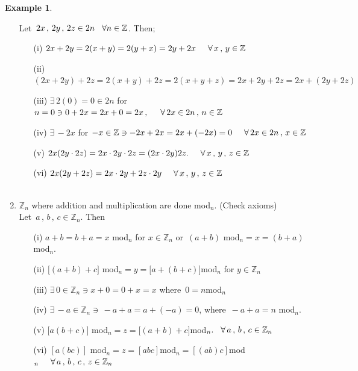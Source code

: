 \documentclass[11pt,a4paper]{article}
\theoremstyle{definition}
\newtheorem{exa}[thm]{Example}
\begin{document}
\begin{exa}
\begin{enumerate}
Let $\, 2x\, , \, 2y\, , \, 2z\in 2n\hspace{0.3cm} \forall n\in \mathbb{Z}$. Then;
\begin{enumerate}
      \item[(i)] $ 2x + 2y = 2(x+ y) = 2(y+x) = 2y + 2x \hspace{0.5cm} \forall\, x\, , \, y\in \mathbb{Z}$
      \item[(ii)] $ (2x + 2y) + 2z = 2(x + y) + 2z  = 2(x + y + z) = 2x + 2y + 2z = 2x + (2y + 2z)$
      \item[(iii)] $\exists\, 2(0) = 0\in 2n$ for $n = 0\ni 0 + 2x  = 2x + 0 = 2x\, , \hspace{0.5cm} \forall\, 2x\in 2n\, , \, n\in \mathbb{Z}$
      \item[(iv)] $\exists\, -2x $ for $-x\in \mathbb{Z} \ni -2x + 2x = 2x + (-2x) = 0\hspace{0.5cm} \forall\, 2x\in 2n\, ,\, x\in \mathbb{Z}$
      \item[(v)] $2x(2y\cdot 2z) = 2x\cdot 2y\cdot 2z = (2x\cdot 2y)2z. \hspace{0.5cm} \forall \, x\, , \, y\, , \, z\in \mathbb{Z}$
      \item[(vi)] $2x (2y + 2z) = 2x\cdot 2y + 2z\cdot 2y\hspace{0.5cm} \forall \, x\, , \, y\, , \, z\in \mathbb{Z}$\\\\
\end{enumerate}



\item $\mathbb{Z}_n$ where addition and multiplication are done mod$_n$.\hspace{0.5cm} (Check axioms)\\

Let $\, a\, , \, b\, , \, c\in \mathbb{Z}_n$. Then
\begin{enumerate}
       \item[(i)] $a + b = b + a = x$ mod$_n$ for $x\in \mathbb{Z}_n$ or $\, (a+b)$ mod$_n = x = (b + a)$ mod$_n$.
       \item[(ii)] $\big[ (a + b) + c\big]$ mod$_n = y = \big[a + (b + c)\big] $mod$_n$ for $y\in \mathbb{Z}_n$
       \item[(iii)] $\exists\, 0 \in \mathbb{Z}_n \ni x + 0 = 0 + x  = x$ where $\, 0 = n$mod$_n$
       \item[(iv)] $\exists\, - a\in \mathbb{Z}_n \ni \, -a + a = a + (-a) = 0$, where $\, -a + a = n$ mod$_n$.
       \item[(v)] $\big[a(b + c)\big]$ mod$_n = z = \big[(a+b) + c\big] $mod$_n.\hspace{0.3cm} \forall\, a\, , \, b\, , \, c\in \mathbb{Z}_n$
       \item[(vi)] $[a(bc)]$ mod$_n = z = [abc] $mod$_n = [(ab)c] $mod$_n\hspace{0.5cm} \forall\, a\, , \, b\, , \, c\, , \,z\in \mathbb{Z}_n$\\\\
\end{enumerate}




\end{enumerate}
\end{exa}
\end{document}
